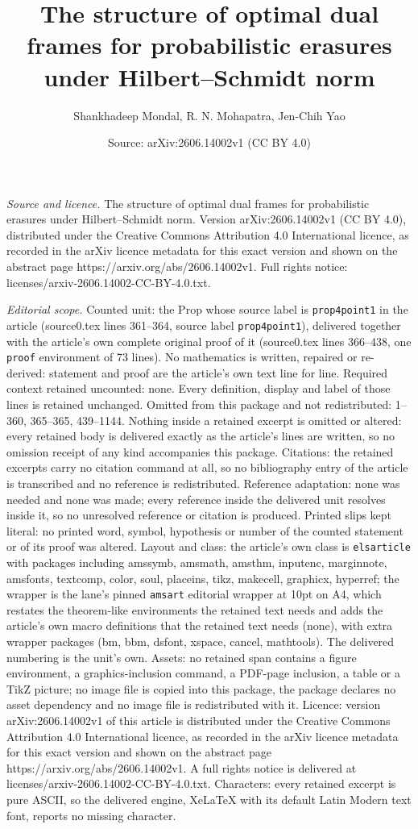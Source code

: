 \documentclass[10pt,a4paper]{amsart}
\title[The structure of optimal dual frames for probabilistic erasu]{The structure of optimal dual frames for probabilistic erasures under Hilbert--Schmidt norm}
\author{Shankhadeep Mondal, R. N. Mohapatra, Jen-Chih Yao}
\date{Source: arXiv:2606.14002v1 (CC BY 4.0)}
\begin{document}
\maketitle

\noindent\emph{Source and licence.} The structure of optimal dual frames for probabilistic erasures under Hilbert--Schmidt norm. Version arXiv:2606.14002v1 (CC BY 4.0), distributed under the Creative Commons Attribution 4.0 International licence, as recorded in the arXiv licence metadata for this exact version and shown on the abstract page https://arxiv.org/abs/2606.14002v1. Full rights notice: licenses/arxiv-2606.14002-CC-BY-4.0.txt.\par\smallskip

\noindent\textit{Editorial scope.} Counted unit: the Prop whose source label is \texttt{prop4point1} in the article (source0.tex lines 361--364, source label \texttt{prop4point1}), delivered together with the article's own complete original proof of it (source0.tex lines 366--438, one \texttt{proof} environment of 73 lines). No mathematics is written, repaired or re-derived: statement and proof are the article's own text line for line. Required context retained uncounted: none. Every definition, display and label of those lines is retained unchanged. Omitted from this package and not redistributed: 1--360, 365--365, 439--1144. Nothing inside a retained excerpt is omitted or altered: every retained body is delivered exactly as the article's lines are written, so no omission receipt of any kind accompanies this package. Citations: the retained excerpts carry no citation command at all, so no bibliography entry of the article is transcribed and no reference is redistributed. Reference adaptation: none was needed and none was made; every reference inside the delivered unit resolves inside it, so no unresolved reference or citation is produced. Printed slips kept literal: no printed word, symbol, hypothesis or number of the counted statement or of its proof was altered. Layout and class: the article's own class is \texttt{elsarticle} with packages including amssymb, amsmath, amsthm, inputenc, marginnote, amsfonts, textcomp, color, soul, placeins, tikz, makecell, graphicx, hyperref; the wrapper is the lane's pinned \texttt{amsart} editorial wrapper at 10pt on A4, which restates the theorem-like environments the retained text needs and adds the article's own macro definitions that the retained text needs (none), with extra wrapper packages (bm, bbm, dsfont, xspace, cancel, mathtools). The delivered numbering is the unit's own. Assets: no retained span contains a figure environment, a graphics-inclusion command, a PDF-page inclusion, a table or a TikZ picture; no image file is copied into this package, the package declares no asset dependency and no image file is redistributed with it. Licence: version arXiv:2606.14002v1 of this article is distributed under the Creative Commons Attribution 4.0 International licence, as recorded in the arXiv licence metadata for this exact version and shown on the abstract page https://arxiv.org/abs/2606.14002v1. A full rights notice is delivered at licenses/arxiv-2606.14002-CC-BY-4.0.txt. Characters: every retained excerpt is pure ASCII, so the delivered engine, XeLaTeX with its default Latin Modern text font, reports no missing character.
\end{document}
